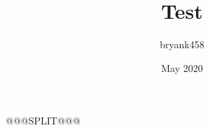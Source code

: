 \documentclass[krants]{krantz}
\title{Test}
\author{bryank458 }
\date{May 2020}
\begin{document}
@@@SPLIT@@@

\printindex
\end{document}
